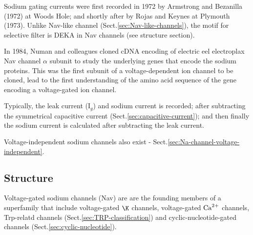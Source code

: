 Sodium gating currents were first recorded in 1972 by Armstrong and Bezanilla
(1972) at Woods Hole; and shortly after by Rojas and Keynes at Plymouth (1973).
Unlike Nav-like channel (Sect.\ref{sec:Nav-like-channels}), the motif for
selective filter is DEKA in Nav channels (see structure section).

In 1984, Numan and colleagues cloned cDNA encoding of electric eel
electroplax Nav channel $\alpha$ subunit to study the underlying
genes that encode the sodium proteins. This was the first subunit of a
voltage-dependent ion channel to be cloned, lead to the first understanding of
the amino acid  sequence of the gene encoding a voltage-gated ion channel.

Typically, the leak current (I$_g$) and sodium current is recorded; after
subtracting the symmetrical capacitive current
(Sect.\ref{sec:capacitive-current}); and then finally the sodium current is
calculated after subtracting the leak current.

Voltage-independent sodium channels also exist -
Sect.\ref{sec:Na-channel-voltage-independent}.


\subsection{Structure}
\label{sec:Na-channel-structure}

Voltage-gated sodium channels (Nav) are are the founding  members of a
superfamily that include voltage-gated $\K$ channels, voltage-gated ${\text{Ca}^{2+}}$
channels, Trp-relatd channels (Sect.\ref{sec:TRP-classification}) and
cyclic-nucleotide-gated channels (Sect.\ref{sec:cyclic-nucleotide}).

